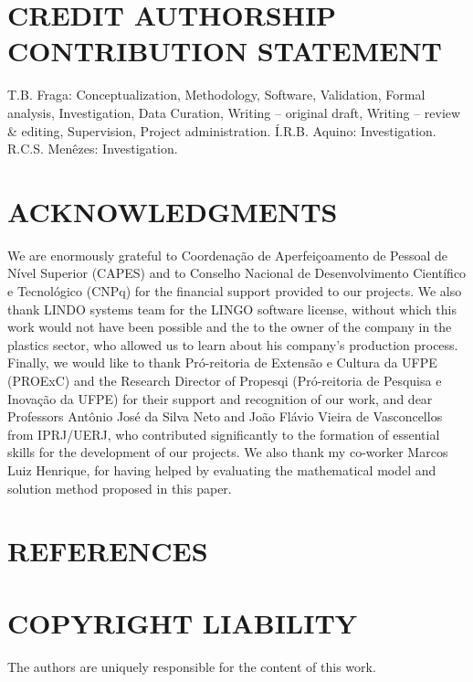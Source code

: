 \documentclass[10pt,fleqn,a4paper,twoside]{article}
\begin{document}
\section{CREDIT AUTHORSHIP CONTRIBUTION STATEMENT} 
\label{sec:contributions}

T.B. Fraga: Conceptualization, Methodology, Software, Validation, Formal analysis, Investigation, Data Curation, Writing – original draft, Writing – review \& editing, Supervision, Project administration. Í.R.B. Aquino: Investigation. R.C.S. Menêzes: Investigation.

\section{ACKNOWLEDGMENTS}
\label{sec:acknowledgments}

We are enormously grateful to Coordenação de Aperfeiçoamento de Pessoal de Nível Superior (CAPES) and to Conselho Nacional de Desenvolvimento Científico e Tecnológico (CNPq) for the financial support provided to our projects. We also thank LINDO systems team for the LINGO software license, without which this work would not have been possible and the to the owner of the company in the plastics sector, who allowed us to learn about his company's production process. Finally, we would like to thank Pró-reitoria de Extensão e Cultura da UFPE (PROExC) and the Research Director of Propesqi (Pró-reitoria de Pesquisa e Inovação da UFPE) for their support and recognition of our work, and dear Professors Antônio José da Silva Neto and João Flávio Vieira de Vasconcellos from IPRJ/UERJ, who contributed significantly to the formation of essential skills for the development of our projects. We also thank my co-worker Marcos Luiz Henrique, for having helped by evaluating the mathematical model and solution method proposed in this paper.

   \section{REFERENCES}
    
    
        
        
        
        
\section{COPYRIGHT LIABILITY}
    
        The authors are uniquely responsible for the content of this work.
\end{document}
